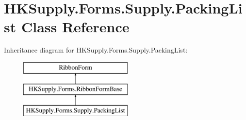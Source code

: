 \hypertarget{class_h_k_supply_1_1_forms_1_1_supply_1_1_packing_list}{}\section{H\+K\+Supply.\+Forms.\+Supply.\+Packing\+List Class Reference}
\label{class_h_k_supply_1_1_forms_1_1_supply_1_1_packing_list}
Inheritance diagram for H\+K\+Supply.\+Forms.\+Supply.\+Packing\+List\+:\begin{figure}[H]
\begin{center}
\leavevmode
\includegraphics[height=3.000000cm]{class_h_k_supply_1_1_forms_1_1_supply_1_1_packing_list}
\end{center}
\end{figure}
